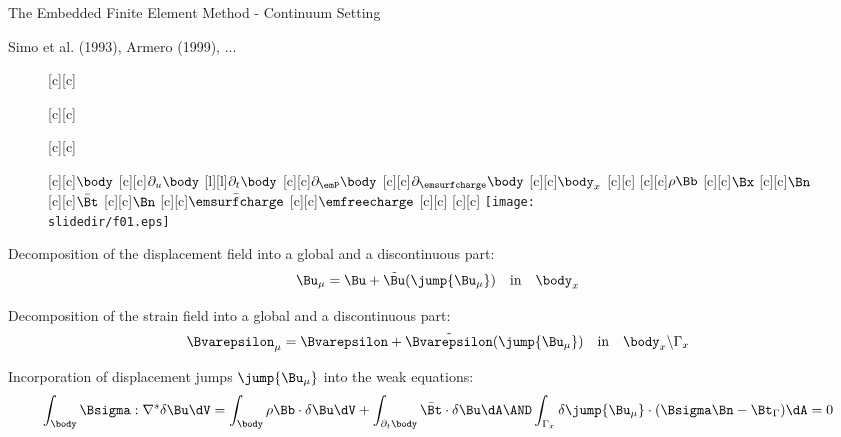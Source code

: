 
\begin{frame}{The Embedded Finite Element Method - Continuum Setting}

\begin{reference}{}{}
Simo et al. (1993), Armero (1999), ...
\end{reference}


\vspace*{-3mm}

\begin{figure}
\centering
{\footnotesize
  [c][c]{\parbox{3cm}{}}
  [c][c]{\parbox{3cm}{}}
  [c][c]{\parbox{3cm}{}}
  [c][c]{$\body$}
  [c][c]{$\partial_u\body$}
  [l][l]{$\partial_t\body$}
  [c][c]{$\partial_\emP\body$}
  [c][c]{$\partial_\emsurfcharge\body$}
  [c][c]{$\body_x$}
  [c][c]{}
  [c][c]{$\rho\Bb$}
  [c][c]{$\Bx$}
  [c][c]{$\Bn$}
  [c][c]{$\bar\Bt$}
  [c][c]{$\Bn$}
  [c][c]{$\bar\emsurfcharge$}
  [c][c]{$\emfreecharge$}
  [c][c]{\red{$\jump{\Bu}$}}
  [c][c]{\red{$\jump{\emP}$}}
  \texttt{[image: \\slidedir/f01.eps]}
}
\end{figure}

\bigskip

Decomposition of the displacement field into a global and a discontinuous part:
\begin{equation*}
\Bu_\mu=\Bu+\tilde\Bu(\jump{\Bu_\mu})\quad\text{in}\quad\body_x
\end{equation*}

\smallskip

Decomposition of the strain field into a global and a discontinuous part:
\begin{equation*}
\Bvarepsilon_\mu=\Bvarepsilon+\tilde\Bvarepsilon(\jump{\Bu_\mu})\quad\text{in}\quad\body_x\backslash\Gamma_x
\end{equation*}

\smallskip

Incorporation of displacement jumps $\jump{\Bu_\mu}$ into the weak equations:
\begin{equation*}
\int_{\body}\Bsigma:\nabla^s\delta\Bu\dV=
\int_{\body}\rho\Bb\cdot\delta\Bu\dV+
\int_{\partial_t\body}\bar\Bt\cdot\delta\Bu\dA
\AND
\int_{\Gamma_x}\delta\jump{\Bu_\mu}\cdot(\Bsigma\Bn-\Bt_\Gamma)\dA=0
\end{equation*}

\smallskip

\end{frame}
